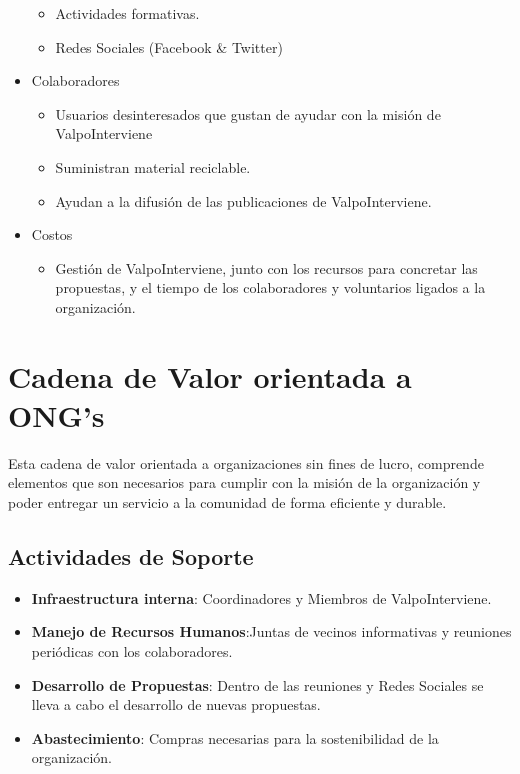 \documentclass[paper=letter, fontsize=11pt]{scrartcl} %
\numberwithin{equation}{section} %
\numberwithin{figure}{section} %
\numberwithin{table}{section} %
\begin{document}
\begin{itemize}
\begin{itemize}
\item Actividades formativas.
\item Redes Sociales (Facebook \& Twitter)
\end{itemize}
\item Colaboradores
\begin{itemize}
\item Usuarios desinteresados que gustan de ayudar con la misión de ValpoInterviene
\item Suministran material reciclable.
\item Ayudan a la difusión de las publicaciones de ValpoInterviene.
\end{itemize}
\item Costos
\begin{itemize}
\item Gestión de  ValpoInterviene, junto con los recursos para concretar las propuestas, y el tiempo de los colaboradores y voluntarios ligados a la organización.
\end{itemize}
\end{itemize} 
\section*{Cadena de Valor orientada a ONG's}
Esta cadena de valor orientada a organizaciones sin fines de lucro, comprende elementos que son necesarios para cumplir con la misión de la organización y poder entregar un servicio a la comunidad de forma eficiente y durable.
\subsection*{Actividades de Soporte}
\begin{itemize}
\item \textbf{Infraestructura interna}: Coordinadores y Miembros de ValpoInterviene.
\item \textbf{Manejo de Recursos Humanos}:Juntas de vecinos informativas y reuniones periódicas con los colaboradores.
\item \textbf{Desarrollo de Propuestas}: Dentro de las reuniones y Redes Sociales se lleva a cabo el desarrollo de nuevas propuestas.
\item \textbf{Abastecimiento}: Compras necesarias para la sostenibilidad de la organización.
\end{itemize}
\end{document}
